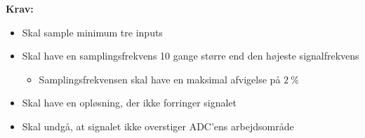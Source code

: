 \vspace{3mm}
\textbf{Krav:}
\begin{itemize}
\item Skal sample minimum tre inputs 
\item Skal have en samplingsfrekvens 10 gange større end den højeste signalfrekvens
\begin{itemize}
\item Samplingsfrekvensen skal have en maksimal afvigelse på $2~\%$
\end{itemize}
\item Skal have en opløsning, der ikke forringer signalet
\item Skal undgå, at signalet ikke overstiger ADC'ens arbejdsområde


\end{itemize}

